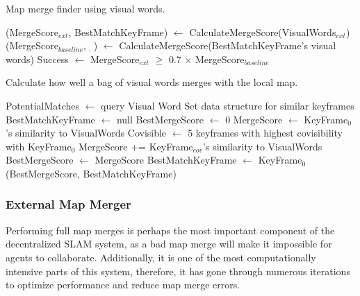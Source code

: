 \begin{algorithm}[H]
    \caption{Map merge finder using visual words.}
    \label{alg:map-merge-finder}
    \begin{algorithmic}[1]
        \State (MergeScore$_{ext}$, BestMatchKeyFrame) $\gets$ CalculateMergeScore(VisualWords$_{ext}$)
        \State (MergeScore$_{baseline}$, $\underbar{\ \ }$) $\gets$ CalculateMergeScore(BestMatchKeyFrame's visual words)
        \State Success $\gets$ MergeScore$_{ext}$ $\geq$ 0.7 $\times$ MergeScore$_{baseline}$
    \end{algorithmic}
\end{algorithm}
\vspace{-0.25in}
\begin{algorithm}[H]
    \caption{Calculate how well a bag of visual words merges with the local map.}
    \label{alg:calculate-merge-score}
    \begin{algorithmic}[1]
        \State PotentialMatches $\gets$ query Visual Word Set data structure for similar keyframes
        \State BestMatchKeyFrame $\gets$ null
        \State BestMergeScore $\gets$ 0
        \State MergeScore $\gets$ KeyFrame$_0$'s similarity to VisualWords
        \State Covisible $\gets$ 5 keyframes with highest covisibility with KeyFrame$_0$
         
        \State MergeScore += KeyFrame$_{cov}$'s similarity to VisualWords
        \EndFor
        \State BestMergeScore $\gets$ MergeScore
        \State BestMatchKeyFrame $\gets$ KeyFrame$_0$
        \EndIf
        \EndFor
        \Return (BestMergeScore, BestMatchKeyFrame)
        \EndProcedure
    \end{algorithmic}
\end{algorithm}

\subsubsection{External Map Merger}
\label{sec:external-map-merger}
Performing full map merges is perhaps the most important component of the decentralized SLAM system, as a bad map merge will make it impossible for agents to collaborate. Additionally, it is one of the most computationally intensive parts of this system, therefore, it has gone through numerous iterations to optimize performance and reduce map merge errors.

